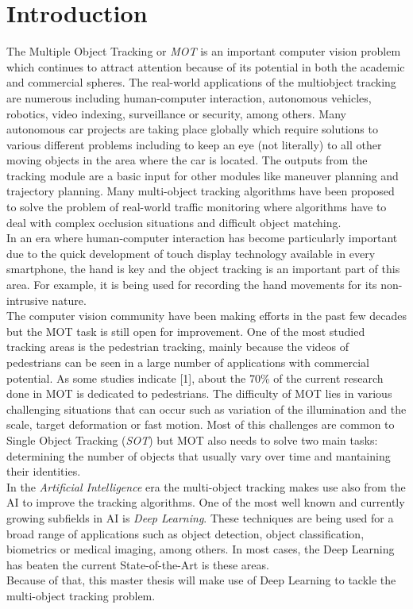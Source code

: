 \chapter{Introduction}\label{cap.introduccion}
\setlength{\parindent}{0pt}
The Multiple Object Tracking or \textit{MOT} is an important computer vision problem which continues to attract attention because of its potential in both the academic and commercial spheres. The real-world applications of the multiobject tracking are numerous including human-computer interaction, autonomous vehicles, robotics, video indexing, surveillance or security, among others. Many autonomous car projects are taking place globally which require solutions to various different problems including to keep an eye (not literally) to all other moving objects in the area where the car is located. The outputs from the tracking module are a basic input for other modules like maneuver planning and trajectory planning. Many multi-object tracking algorithms have been proposed to solve the problem of real-world traffic monitoring where algorithms have to deal with complex occlusion situations and difficult object matching.\\
In an era where human-computer interaction has become particularly important due to the quick development of touch display technology available in every smartphone, the hand is key and the object tracking is an important part of this area. For example, it is being used for recording the hand movements for its non-intrusive nature.
\\
The computer vision community have been making efforts in the past few decades but the MOT task is still open for improvement. One of the most studied tracking areas is the pedestrian tracking, mainly because the videos of pedestrians can be seen in a large number of applications with commercial potential. As some studies indicate [1], about the 70\% of the current research done in MOT is dedicated to pedestrians. The difficulty of MOT lies in various challenging situations that can occur such as variation of the illumination and the scale, target deformation or fast motion. Most of this challenges are common to Single Object Tracking (\textit{SOT}) but MOT also needs to solve two main tasks: determining the number of objects that usually vary over time and mantaining their identities.\\
In the \textit{Artificial Intelligence} era the multi-object tracking makes use also from the AI to improve the tracking algorithms. One of the most well known and currently growing subfields in AI is \textit{Deep Learning}. These techniques are being used for a broad range of applications such as object detection, object classification, biometrics or medical imaging, among others. In most cases, the Deep Learning has beaten the current State-of-the-Art is these areas.\\
Because of that, this master thesis will make use of Deep Learning to tackle the multi-object tracking problem.

